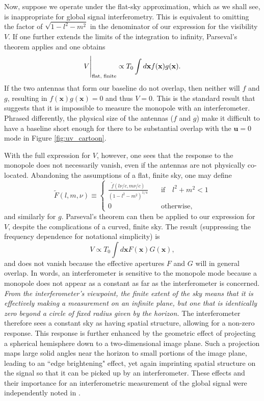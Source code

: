 \documentclass[twocolumn,apj,numberedappendix]{emulateapj}
\begin{document}
Now, suppose we operate under the flat-sky approximation, which as we shall see, is inappropriate for global signal interferometry. This is equivalent to omitting the
factor of $\sqrt{1-l^2 - m^2}$ in the denominator of our expression for the visibility $V$.
If one further extends the limits of the integration to infinity, Parseval's theorem applies and
one obtains
\begin{equation}
\label{eq:fdotg}
V\Bigg{|}_\textrm{flat, finite} \propto T_0 \int d\mathbf{x} f (\mathbf{x}) g(\mathbf{x}).
\end{equation}
If the two antennas that form our baseline do not overlap, then neither will $f$ and $g$, resulting
in $f (\mathbf{x}) g(\mathbf{x}) = 0$ and thus $V=0$. This is the standard result that suggests
that it is impossible to measure the monopole with an interferometer. Phrased differently, the
physical size of the antennas ($f$ and $g$) make it difficult to have a baseline short enough
for there to be substantial overlap with the $\mathbf{u} = 0$ mode in Figure \ref{fig:uv_cartoon}.

With the full expression for $V$, however, one sees that the response to the monopole does
not necessarily vanish, even if the antennas are not physically co-located. Abandoning the
assumptions of a flat, finite sky, one may define
\begin{equation}
\widetilde{F} (l, m, \nu) \equiv
\begin{cases}
\frac{\tilde{f} (l\nu / c,m\nu / c)}{(1-l^2 - m^2)^{1/4}} \quad & \textrm{if} \quad l^2 + m^2 < 1 \\
0 \quad &\textrm{otherwise},
\end{cases}
\end{equation}
and similarly for $g$. Parseval's theorem can then be applied to our expression for $V$, despite
the complications of a curved, finite sky. The result (suppressing the frequency dependence for
notational simplicity) is
\begin{equation}
\label{eq:effFdotG}
V \propto T_0 \int d\mathbf{x} F(\mathbf{x}) G(\mathbf{x}),
\end{equation}
and does not vanish because the effective apertures $F$ and $G$ will in general overlap. In words,
an interferometer is sensitive to the monopole mode because a monopole does not appear as a
constant as far as the interferometer is concerned. \emph{From the interferometer's viewpoint, the finite
extent of the sky means that it is effectively making a measurement on an infinite plane, but one that is identically zero beyond a circle of fixed radius given by the horizon.} The interferometer therefore
sees a constant sky as having spatial structure, allowing for a non-zero response. This response
is further enhanced by the geometric effect of projecting a spherical hemisphere down to a two-dimensional
image plane. Such a projection maps large solid angles near the horizon to small portions of the image
plane, leading to an ``edge brightening" effect, yet again imprinting spatial structure on the signal so that it can be picked up by an interferometer. These
effects and their importance for an interferometric measurement of the global signal were independently
noted in \citet{Thyagarajan_et_al2015}. 
\end{document}
